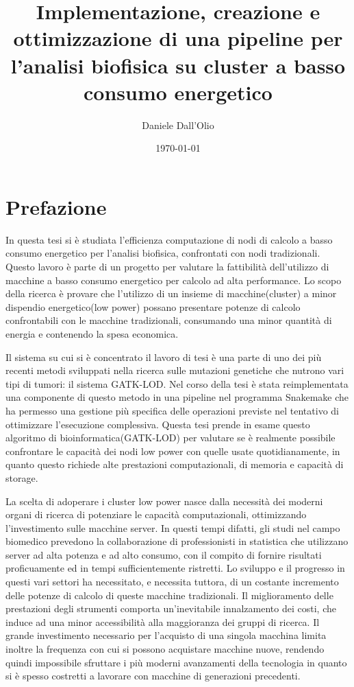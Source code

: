 \documentclass[12pt, a4paper]{report}
\title{Implementazione, creazione e ottimizzazione di una pipeline per l'analisi biofisica su cluster a basso consumo energetico}
\author{Daniele Dall'Olio}
\date{\today}
\begin{document}

\section*{Prefazione}
In questa tesi si è studiata l'efficienza computazione di nodi di calcolo a basso consumo energetico per l'analisi biofisica, confrontati con nodi tradizionali.
Questo lavoro è parte di un progetto per valutare la fattibilità dell'utilizzo di macchine a basso consumo energetico per calcolo ad alta performance.
Lo scopo della ricerca è provare che l'utilizzo di un insieme di macchine(cluster) a minor dispendio energetico(low power) possano presentare potenze di calcolo confrontabili con le macchine tradizionali, consumando una minor quantità di energia e contenendo la spesa economica.  

Il sistema su cui si è concentrato il lavoro di tesi è una parte di uno dei più recenti metodi sviluppati nella ricerca sulle mutazioni genetiche che nutrono vari tipi di tumori: il sistema GATK-LOD.
Nel corso della tesi è stata reimplementata una componente di questo metodo in una pipeline nel programma Snakemake che ha permesso una gestione più specifica delle operazioni previste nel tentativo di ottimizzare l'esecuzione complessiva. 
Questa tesi prende in esame questo algoritmo di bioinformatica(GATK-LOD) per valutare se è realmente possibile confrontare le capacità dei nodi low power con quelle usate quotidianamente, in quanto questo richiede alte prestazioni computazionali, di memoria e capacità di storage.


La scelta di adoperare i cluster low power nasce dalla necessità dei moderni organi di ricerca di potenziare le capacità computazionali, ottimizzando l'investimento sulle macchine server.
In questi tempi difatti, gli studi nel campo biomedico prevedono la collaborazione di professionisti in statistica che utilizzano server ad alta potenza e ad alto consumo, con il compito di fornire risultati proficuamente ed in tempi sufficientemente ristretti.
Lo sviluppo e il progresso in questi vari settori ha necessitato, e necessita tuttora, di un costante incremento delle potenze di calcolo di queste macchine tradizionali.
Il miglioramento delle prestazioni degli strumenti comporta un'inevitabile innalzamento dei costi, che induce ad una minor accessibilità alla maggioranza dei gruppi di ricerca.
Il grande investimento necessario per l'acquisto di una singola macchina limita inoltre la frequenza con cui si possono acquistare macchine nuove, rendendo quindi impossibile sfruttare i più moderni avanzamenti della tecnologia in quanto si è spesso costretti a lavorare con macchine di generazioni precedenti.
\end{document}

